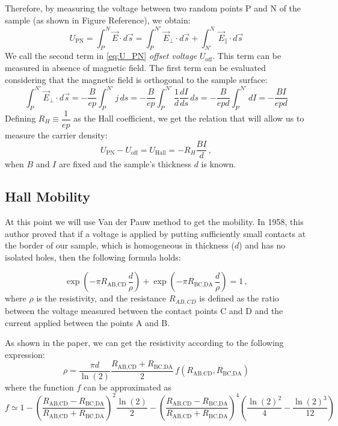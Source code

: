 \documentclass[11pt,a4paper]{article}
\begin{document}
Therefore, by measuring the voltage between two random points P and N of the sample (as shown in Figure {\color{red}Reference}), we obtain:
\begin{equation}\label{eq:U_PN}
U_\text{PN}=\int_P^N\vec{E}\cdot d\vec{s}=\int_P^{N'}\vec{E}_\perp\cdot d\vec{s}+\int_{N'}^N\vec{E}_\parallel\cdot d\vec{s}
\end{equation}
We call the second term in \eqref{eq:U_PN} \emph{offset voltage} $U_\text{off}$. This term can be measured in absence of magnetic field. The first term can be evaluated considering that the magnetic field is orthogonal to the sample surface:
\begin{equation}
\int_P^{N'}\vec{E}_\perp\cdot d\vec{s}=-\frac{B}{ep}\int_P^{N'}j\, ds=-\frac{B}{ep}\int_P^{N'}\frac{1}{d}\frac{dI}{ds}\, ds=-\frac{B}{epd}\int_P^{N'} dI=-\frac{BI}{epd}
\end{equation}
Defining $R_H\equiv\dfrac{1}{ep}$ as the Hall coefficient, we get the relation that will allow us to measure the carrier density:
\begin{equation}\label{eq:Hall_voltage}
U_\text{PN}-U_\text{off}=U_\text{Hall}=-R_H\frac{BI}{d}\,,
\end{equation}
when $B$ and $I$ are fixed and the sample's thickness $d$ is known.




\subsection{Hall Mobility}
At this point we will use Van der Pauw method to get the mobility. In 1958, this author \cite{vdP} proved that if a voltage is applied by putting sufficiently small contacts at the border of our sample, which is homogeneous in thickness ($d$) and has no isolated holes, then the following formula holds:

\begin{equation}
\exp\left(-\pi R_\text{AB,CD}\,\frac{d}{\rho}\right)+\exp\left(-\pi R_\text{BC,DA}\,\frac{d}{\rho}\right)=1\,,
\end{equation}
where $\rho$ is the resistivity, and the resistance $R_{AB,CD}$ is defined as the ratio between the voltage measured between the contact points C and D and the current applied between the points A and B.

As shown in the paper, we can get the resistivity according to the following expression:
\begin{equation}
\rho=\frac{\pi d}{\ln(2)}\frac{R_\text{AB,CD}+R_\text{BC,DA}}{2}\,f\!\left(R_\text{AB,CD},R_\text{BC,DA}\right)
\end{equation}
where the function $f$ can be approximated as
\begin{equation}
f \simeq 1-\left(\frac{R_\text{AB,CD}-R_\text{BC,DA}}{R_\text{AB,CD}+R_\text{BC,DA}}\right)^2 \frac{\ln(2)}{2}-\left(\frac{R_\text{AB,CD}-R_\text{BC,DA}}{R_\text{AB,CD}+R_\text{BC,DA}}\right)^4\left(\frac{\ln(2)^2}{4}-\frac{\ln(2)^3}{12}\right)
\end{equation}
\end{document}
